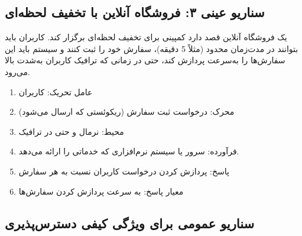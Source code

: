 \subsection{سناریو عینی ۳: فروشگاه آنلاین با تخفیف لحظه‌ای}

یک فروشگاه آنلاین قصد دارد کمپینی برای تخفیف لحظه‌ای برگزار کند. کاربران باید
بتوانند در مدت‌زمان محدود (مثلاً 5 دقیقه)، سفارش خود را ثبت کنند و سیستم باید
این سفارش‌ها را به‌سرعت پردازش کند، حتی در زمانی که ترافیک کاربران به‌شدت بالا
می‌رود.

\begin{multicols}{3}
    \begin{enumerate}
        \item عامل تحریک: کاربران
        \item محرک: درخواست ثبت سفارش (ریکوئستی که ارسال می‌شود)
        \item محیط: نرمال و حتی در ترافیک
        \item فرآورده: سرور یا سیستم نرم‌افزاری که خدماتی را ارائه می‌دهد.
        \item پاسخ: پردازش کردن درخواست کاربران نسبت به هر سفارش
        \item معیار پاسخ: به سرعت پردازش کردن سفارش‌ها
    \end{enumerate} 
\end{multicols}

\subsection{سناریو عمومی برای ویژگی کیفی دسترس‌پذیری}

